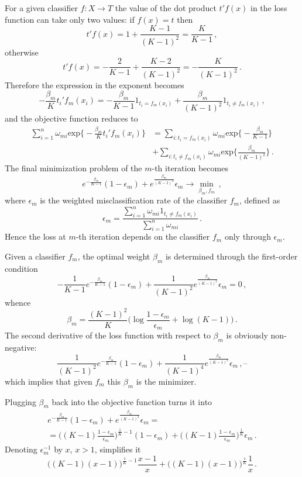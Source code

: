 \documentclass[a4paper]{article}
\begin{document}
For a given classifier $f: X\to T$ the value of the dot product $t'f(x)$ in the loss
function can take only two values: if $f(x) = t$ then
\[ t'f(x) = 1 + \frac{K-1}{(K-1)^2} = \frac{K}{K-1}\,, \]
otherwise
\[ t'f(x) = -\frac{2}{K-1} + \frac{K-2}{(K-1)^2} = -\frac{K}{(K-1)^2} \,. \]
Therefore the expression in the exponent becomes
\[
-\frac{\beta_m}{K} t_i'f_m(x_i)
= -\frac{\beta_m}{K-1} 1_{t_i=f_m(x_i)}
	+ \frac{\beta_m}{(K-1)^2} 1_{t_i \neq f_m(x_i)} \,,
\]
and the objective function reduces to
\begin{align*}
	\sum_{i=1}^n \omega_{mi} \text{exp}\bigl\{ -\frac{\beta_m}{K} t_i' f_m(x_i) \bigr\}
	&= \sum_{i:t_i = f_m(x_i)} \omega_{mi} \text{exp}\bigl\{ -\frac{\beta_m}{K-1} \bigr\} \\
	&+ \sum_{i:t_i \neq f_m(x_i)} \omega_{mi} \text{exp}\bigl\{ \frac{\beta_m}{(K-1)^2} \bigr\} \,.
\end{align*}
The final minimization problem of the $m$-th iteration becomes
\[
e^{ -\frac{\beta_m}{K-1} }(1-\epsilon_m)
	+ e^{ \frac{\beta_m}{(K-1)^2} }\epsilon_m
\to \min_{\beta_m,f_m}
\,, \]
where $\epsilon_m$ is the weighted misclassification rate of the classifier $f_m$,
defined as
\[
\epsilon_m
= \frac{ \sum_{i=1}^n \omega_{mi}1_{t_i\neq f_m(x_i)} }{ \sum_{i=1}^n \omega_{mi} }
\,. \]
Hence the loss at $m$-th iteration depends on the classifier $f_m$ only through $\epsilon_m$.

Given a classifier $f_m$, the optimal weight $\beta_m$ is determined through the
first-order condition
\[
- \frac{1}{K-1} e^{ -\frac{\beta_m}{K-1} } (1-\epsilon_m)
+ \frac{1}{(K-1)^2} e^{ \frac{\beta_m}{(K-1)^2} } \epsilon_m = 0
\,, \]
whence
\[
\beta_m = \frac{(K-1)^2}{K} \biggl( \log \frac{1-\epsilon_m}{\epsilon_m} + \log (K-1) \biggr)
\,. \]
The second derivative of the loss function with respect to $\beta_m$ is obviously
non-negative:
\[
\frac{1}{(K-1)^2} e^{ -\frac{\beta_m}{K-1} } (1-\epsilon_m)
+ \frac{1}{(K-1)^4} e^{ \frac{\beta_m}{(K-1)^2} } \epsilon_m
\,,\text{--}\]
which implies that given $f_m$ this $\beta_m$ is the minimizer.

Plugging $\beta_m$ back into the objective function turns it into
\begin{multline*}
	e^{ -\frac{\beta_m}{K-1} } (1-\epsilon_m) + e^{ \frac{\beta_m}{(K-1)^2} } \epsilon_m = \\
	= \biggl( (K-1) \frac{1-\epsilon_m}{\epsilon_m} \biggr)^{ \frac{1}{K}-1 } (1-\epsilon_m)
		+ \biggl( (K-1) \frac{1-\epsilon_m}{\epsilon_m} \biggr)^{ \frac{1}{K} } \epsilon_m \,.
\end{multline*}
Denoting $\epsilon_m^{-1}$ by $x$, $x > 1$, simplifies it
\[
\bigl( (K-1) (x-1) \bigr)^{ \frac{1}{K}-1 } \frac{x-1}{x}
	+ \bigl( (K-1) (x-1) \bigr)^{ \frac{1}{K} } \frac{1}{x}
\,. \]
\end{document}
